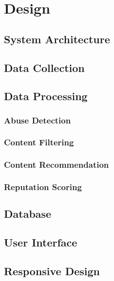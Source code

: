 \chapter{Design}
\label{Chapter:Design}

\section{System Architecture}

\section{Data Collection}

\section{Data Processing}
\subsection{Abuse Detection}
\subsection{Content Filtering}
\subsection{Content Recommendation}
\subsection{Reputation Scoring}

\section{Database}

\section{User Interface}

\section{Responsive Design}